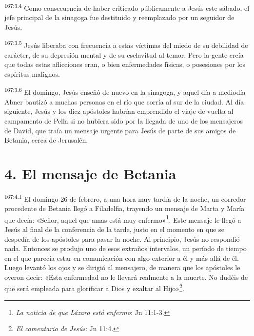 \par 
\textsuperscript{167:3.4} Como consecuencia de haber criticado públicamente a Jesús este sábado, el jefe principal de la sinagoga fue destituido y reemplazado por un seguidor de Jesús.

\par 
\textsuperscript{167:3.5} Jesús liberaba con frecuencia a estas víctimas del miedo de su debilidad de carácter, de su depresión mental y de su esclavitud al temor. Pero la gente creía que todas estas aflicciones eran, o bien enfermedades físicas, o posesiones por los espíritus malignos.

\par 
\textsuperscript{167:3.6} El domingo, Jesús enseñó de nuevo en la sinagoga, y aquel día a mediodía Abner bautizó a muchas personas en el río que corría al sur de la ciudad. Al día siguiente, Jesús y los diez apóstoles habrían emprendido el viaje de vuelta al campamento de Pella si no hubiera sido por la llegada de uno de los mensajeros de David, que traía un mensaje urgente para Jesús de parte de sus amigos de Betania, cerca de Jerusalén.

\section*{4. El mensaje de Betania}
\par 
\textsuperscript{167:4.1} El domingo 26 de febrero, a una hora muy tardía de la noche, un corredor procedente de Betania llegó a Filadelfia, trayendo un mensaje de Marta y María que decía: «Señor, aquel que amas está muy enfermo»\footnote{\textit{La noticia de que Lázaro está enfermo}: Jn 11:1-3.}. Este mensaje le llegó a Jesús al final de la conferencia de la tarde, justo en el momento en que se despedía de los apóstoles para pasar la noche. Al principio, Jesús no respondió nada. Entonces se produjo uno de esos extraños intervalos, un período de tiempo en el que parecía estar en comunicación con algo exterior a él y más allá de él. Luego levantó los ojos y se dirigió al mensajero, de manera que los apóstoles le oyeron decir: «Esta enfermedad no le llevará realmente a la muerte. No dudéis de que será empleada para glorificar a Dios y exaltar al Hijo»\footnote{\textit{El comentario de Jesús}: Jn 11:4.}.

